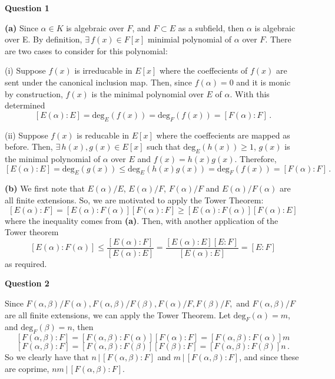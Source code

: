 \documentclass[10pt]{article}
\begin{document}
\textbf{Question 1}

\textbf{(a)} Since $\alpha \in K$ is algebraic over $F$, and $F \subset E$ as a subfield, then $\alpha$ is algebraic over E. By definition, $\exists\, f(x)\in F[x]$ minimial polynomial of $\alpha$ over $F$. There are two cases to consider for this polynomial:

(i) Suppose $f(x)$ is irreducable in $E[x]$ where the coeffecients of $f(x)$ are sent under the canonical inclusion map. Then, since $f(\alpha) = 0$ and it is monic by construction, $f(x)$ is the minimal polynomial over $E$ of $\alpha$. With this determined
\[ [E(\alpha):E] = \text{deg}_{E}(f(x)) = \text{deg}_{F}(f(x)) = [F(\alpha):F] \,.\]

(ii) Suppose $f(x)$ is reducable in $E[x]$ where the coeffecients are mapped as before. Then, $\exists\, h(x),g(x)\in E[x]$ such that $\text{deg}_{E}(h(x)) \geq 1$, $g(x)$ is the minimal polynomial of $\alpha$ over $E$ and $f(x) = h(x)g(x)$. Therefore,
\[ [E(\alpha):E] = \text{deg}_{E}(g(x)) \leq \text{deg}_{E}(h(x)g(x)) = \text{deg}_{F}(f(x)) = [F(\alpha):F] \, .\]

\textbf{(b)} We first note that $E(\alpha)/E$, $E(\alpha)/F$, $F(\alpha)/F$ and $E(\alpha)/F(\alpha)$ are all finite extensions. So, we are motivated to apply the Tower Theorem:
\[ [E(\alpha):F] = [E(\alpha):F(\alpha)][F(\alpha):F] \geq [E(\alpha):F(\alpha)][F(\alpha):E] \]
where the inequality comes from \textbf{(a)}. Then, with another application of the Tower theorem
\[ [E(\alpha):F(\alpha)] \leq \frac{[E(\alpha):F]}{[E(\alpha):E]} = \frac{[E(\alpha):E][E:F]}{[E(\alpha):E]} = [E:F]\]
as required.

\newpage
\textbf{Question 2}

Since $F(\alpha,\beta)/F(\alpha),F(\alpha,\beta)/F(\beta),F(\alpha)/F,F(\beta)/F,$ and $F(\alpha,\beta)/F$ are all finite extensions, we can apply the Tower Theorem. Let $\text{deg}_{F}(\alpha) = m$, and $\text{deg}_{F}(\beta) = n$, then
\[ [F(\alpha,\beta):F] = [F(\alpha,\beta):F(\alpha)][F(\alpha):F] = [F(\alpha,\beta):F(\alpha)]m \]
\[ [F(\alpha,\beta):F] = [F(\alpha,\beta):F(\beta)][F(\beta):F] = [F(\alpha,\beta):F(\beta)]n \,.\]
So we clearly have that $n \, |\, [F(\alpha,\beta):F]$ and $m \, |\, [F(\alpha,\beta):F]$, and since these are coprime, $nm \, | \,[F(\alpha,\beta):F]$.
\end{document}
